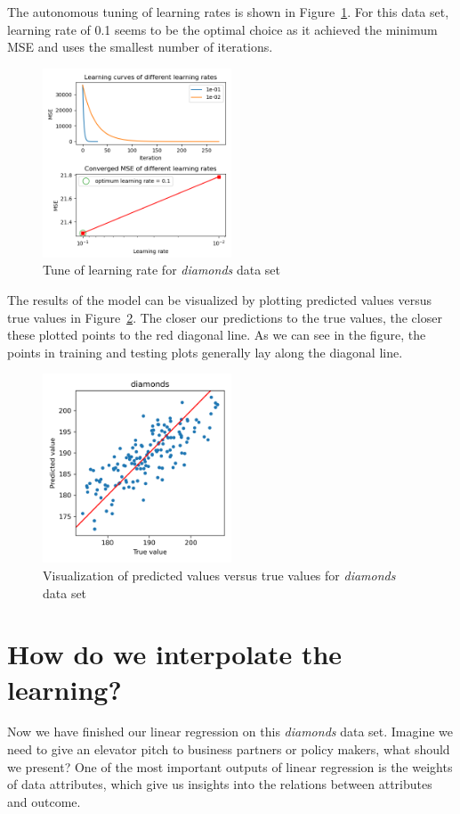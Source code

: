 \documentclass[
	letterpaper
]{article}
\begin{document}
The autonomous tuning of learning rates is shown in Figure~\ref{fig:tune-lr}.
For this data set, learning rate of 0.1 seems to be the optimal choice as it achieved the minimum MSE and uses the smallest number of iterations.
\begin{figure}[htbp]
	\centering
	\includegraphics[width=0.5\textwidth]{figures/tune-lr.png}
	\caption{Tune of learning rate for \textit{diamonds} data set}
	\label{fig:tune-lr}
\end{figure}

The results of the model can be visualized by plotting predicted values versus true values in Figure~\ref{fig:res_diamonds}.
The closer our predictions to the true values, the closer these plotted points to the red diagonal line.
As we can see in the figure, the points in training and testing plots generally lay along the diagonal line. 
\begin{figure}[htbp]
	\centering
	\includegraphics[width=0.5\textwidth]{figures/our-result-diamonds.png}
	\caption{Visualization of predicted values versus true values for \textit{diamonds} data set}
	\label{fig:res_diamonds}
\end{figure}

\section{How do we interpolate the learning?}
Now we have finished our linear regression on this \textit{diamonds} data set. 
Imagine we need to give an elevator pitch to business partners or policy makers, what should we present?
One of the most important outputs of linear regression is the weights of data attributes, which give us insights into the relations between attributes and outcome.
\end{document}
